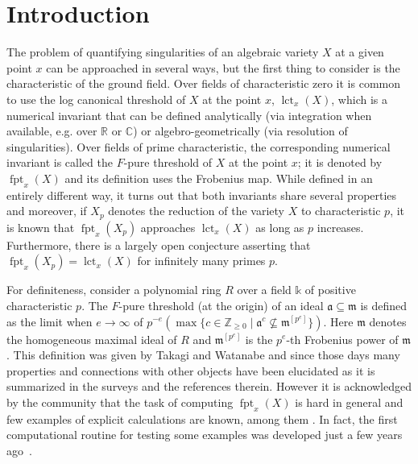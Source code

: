\documentclass[12pt]{amsart}
\theoremstyle{definition}
\numberwithin{equation}{subsection}
\DeclareMathOperator{\fpt}{fpt}
\newcommand{\lct}{{\operatorname{lct}}}
\newcommand{\CC}{\mathbb{C}}
\newcommand{\RR}{\mathbb{R}}
\newcommand{\m}{\mathfrak{m}}
\newcommand{\fa}{\mathfrak{a}}
\renewcommand{\!}[1]{{\color{red}\text{\Huge$\star$ }#1}}
\begin{document}
\section{Introduction}
The problem of quantifying singularities of an algebraic variety $X$ at a given point $x$  can be approached in several ways, but the first thing to consider is the characteristic of the ground field. Over fields of characteristic zero it is common to use the log canonical threshold of $X$ at the point $x$, $\lct_x(X)$, which is a numerical invariant that can be defined analytically (via integration when available, e.g. over $\RR$ or $\CC$) or algebro-geometrically (via resolution of singularities). Over fields of prime characteristic, the corresponding numerical invariant is called the $F$-pure threshold of $X$ at the point $x$; it is denoted by $\fpt_x(X)$ and its definition uses the Frobenius map. While defined in an entirely different way, it turns out that both invariants share several properties and moreover, if $X_p$ denotes the reduction of the
variety $X$ to characteristic $p$, it is known that $\fpt_x(X_p)$ approaches $\lct_x(X)$ as long as $p$ increases. Furthermore, there is a largely open conjecture asserting that $\fpt_x(X_p)=\lct_x(X)$ for infinitely many primes $p$.

For definiteness, consider a polynomial ring $R$ over a field $\mathbb{k}$ of positive characteristic $p$. The $F$-pure threshold (at the origin) of an ideal $\fa\subseteq\m$ is defined as the limit when $e\to \infty$ of $p^{-e}(\max \{c \in \mathbb{Z}_{\geq 0} \mid \mathfrak{a}^c \not \subseteq \m^{[p^{e}]}\})$. Here $\m$ denotes the homogeneous maximal ideal of $R$ and $\m^{[p^{e}]}$ is the $p^{e}$-th Frobenius power of $\m$. This definition was given by 
Takagi and Watanabe \cite{TW2004} and since those days many properties and connections with other objects have been elucidated as it is summarized in the surveys \cite{BFS2013,TaWa2018} and the references therein. However it is acknowledged by the community that the task of computing $\fpt_x(X)$ is hard in general and few examples of explicit calculations are known, among them \cite{ShTa,HDbinomial,MiSiVa,BhSi15,HDpolynomials,HNBW2016,Gil18,Mu18,Gil22,Tri,GVJVNB,SmVra}. In fact, the first computational routine for testing some examples was developed just a few years ago~\cite{MacFrobThre}.
 
\end{document}
